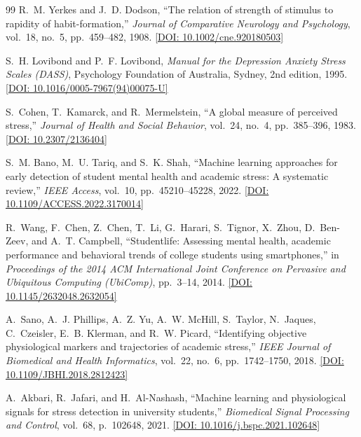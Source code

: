\documentclass[12pt,a4paper,oneside]{report}
\begin{document}
\begin{thebibliography}{99}
R.~M. Yerkes and J.~D. Dodson,
\newblock ``The relation of strength of stimulus to rapidity of habit-formation,''
\newblock \emph{Journal of Comparative Neurology and Psychology}, vol.~18, no.~5, pp.~459--482, 1908. \href{https://doi.org/10.1002/cne.920180503}{[DOI: 10.1002/cne.920180503]}

S.~H. Lovibond and P.~F. Lovibond,
\newblock \emph{Manual for the Depression Anxiety Stress Scales (DASS)},
\newblock Psychology Foundation of Australia, Sydney, 2nd edition, 1995. \href{https://doi.org/10.1016/0005-7967(94)00075-U}{[DOI: 10.1016/0005-7967(94)00075-U]}

S.~Cohen, T.~Kamarck, and R.~Mermelstein,
\newblock ``A global measure of perceived stress,''
\newblock \emph{Journal of Health and Social Behavior}, vol.~24, no.~4, pp.~385--396, 1983. \href{https://doi.org/10.2307/2136404}{[DOI: 10.2307/2136404]}

S.~M. Bano, M.~U. Tariq, and S.~K. Shah,
\newblock ``Machine learning approaches for early detection of student mental health and academic stress: A systematic review,''
\newblock \emph{IEEE Access}, vol.~10, pp.~45210--45228, 2022. \href{https://doi.org/10.1109/ACCESS.2022.3170014}{[DOI: 10.1109/ACCESS.2022.3170014]}

R.~Wang, F.~Chen, Z.~Chen, T.~Li, G.~Harari, S.~Tignor, X.~Zhou, D.~Ben-Zeev, and A.~T. Campbell,
\newblock ``Studentlife: Assessing mental health, academic performance and behavioral trends of college students using smartphones,''
\newblock in \emph{Proceedings of the 2014 ACM International Joint Conference on Pervasive and Ubiquitous Computing (UbiComp)}, pp.~3--14, 2014. \href{https://doi.org/10.1145/2632048.2632054}{[DOI: 10.1145/2632048.2632054]}

A.~Sano, A.~J. Phillips, A.~Z. Yu, A.~W. McHill, S.~Taylor, N.~Jaques, C.~Czeisler, E.~B. Klerman, and R.~W. Picard,
\newblock ``Identifying objective physiological markers and trajectories of academic stress,''
\newblock \emph{IEEE Journal of Biomedical and Health Informatics}, vol.~22, no.~6, pp.~1742--1750, 2018. \href{https://doi.org/10.1109/JBHI.2018.2812423}{[DOI: 10.1109/JBHI.2018.2812423]}

A.~Akbari, R.~Jafari, and H.~Al-Nashash,
\newblock ``Machine learning and physiological signals for stress detection in university students,''
\newblock \emph{Biomedical Signal Processing and Control}, vol.~68, p.~102648, 2021. \href{https://doi.org/10.1016/j.bspc.2021.102648}{[DOI: 10.1016/j.bspc.2021.102648]}


\end{thebibliography}
\end{document}
